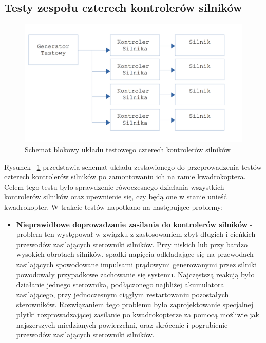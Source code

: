 \subsection{Testy zespołu czterech kontrolerów silników}


\begin{figure}[H]
	\centering
	\includegraphics[scale=0.2]{Pictures/TestyKontroleraSilnikow_x4.png}
	\caption[Schemat blokowy układu testowego czterech kontrolerów silników]{Schemat blokowy układu testowego czterech kontrolerów silników}
	\label{fig:MotorController_test_four}
\end{figure}

Rysunek ~\ref{fig:MotorController_test_four} przedstawia schemat układu zestawionego do przeprowadzenia testów czterech kontrolerów silników po zamontowaniu ich na ramie kwadrokoptera. Celem tego testu było sprawdzenie rówoczesnego działania wszystkich kontrolerów silników oraz upewnienie się, czy będą one w stanie unieść kwadrokopter. W trakcie testów napotkano na następujące problemy:
\begin{itemize}
	\item \textbf{Nieprawidłowe doprowadzanie zasilania do kontrolerów silników} - problem ten występował w związku z zastosowaniem zbyt długich i cieńkich przewodów zasilających sterowniki silników. Przy niskich lub przy bardzo wysokich obrotach silników, spadki napięcia odkładające się na przewodach zasilających spowodowane impulsami prądowymi generowanymi przez silniki powodowały przypadkowe zachowanie się systemu. Najczęstszą reakcją było działanie jednego sterownika, podłączonego najbliżej akumulatora zasilającego, przy jednoczesnym ciągłym restartowaniu pozostałych sterowników. Rozwiązaniem tego problemu było zaprojektowanie specjalnej płytki rozprowadzającej zasilanie po kwadrokopterze za pomocą możliwie jak najszerszych miedzianych powierzchni, oraz skrócenie i pogrubienie przewodów zasilających sterowniki silników.
\end{itemize}

